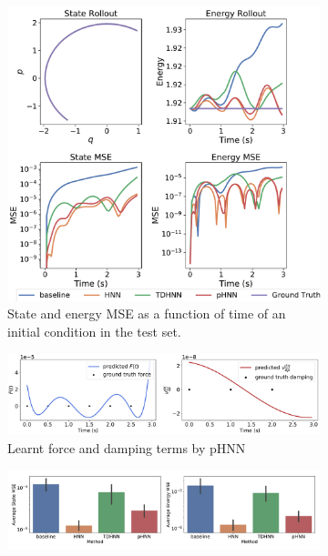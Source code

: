 \documentclass{article}
\begin{document}
\begin{figure}[h!]
\centering
\captionsetup{justification=centering}
	\begin{subfigure}[b]{0.4\textwidth}
		\centering
		\includegraphics[width=\textwidth, trim={0 0 0 12cm},clip]{figures/figures/mass_spring/1/mass_spring_long_0.pdf}
		\caption{State and energy MSE as a function of time of an initial condition in the test set.}
	\end{subfigure}
	\begin{subfigure}[b]{0.48\textwidth}
		\centering
		\includegraphics[width=\textwidth]{figures/figures/mass_spring/1/mass_spring_dpdt_new_0.pdf}
		\caption{Learnt force and damping terms by pHNN}
	\end{subfigure}
	\begin{subfigure}[b]{0.48\textwidth}
	    \centering
		\includegraphics[width=\textwidth]{figures/figures/mass_spring/1/mass_spring_errors_0.pdf}

\end{subfigure}
\end{figure}
\end{document}
